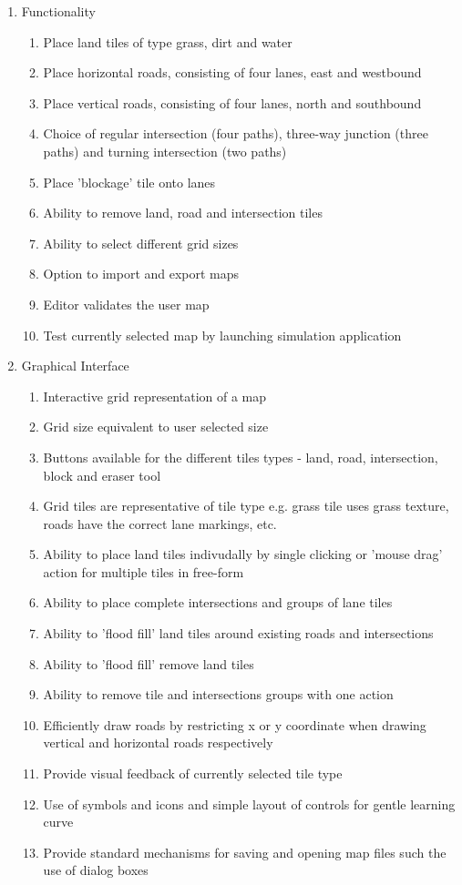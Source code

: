 \begin{enumerate}\itemsep1pt \parskip0pt 
  \item Functionality
  \begin{enumerate}[label*=\arabic*.]
    \item Place land tiles of type grass, dirt and water
    \item Place horizontal roads, consisting of four lanes, east and westbound
    \item Place vertical roads, consisting of four lanes, north and southbound
    \item Choice of regular intersection (four paths), three-way junction (three paths) and turning intersection (two paths) 
    \item Place 'blockage' tile onto lanes
    \item Ability to remove land, road and intersection tiles
    \item Ability to select different grid sizes
    \item Option to import and export maps
	\item Editor validates the user map
	\item Test currently selected map by launching simulation application
  \end{enumerate}
    \item Graphical Interface
  \begin{enumerate}[label*=\arabic*.]
	\item Interactive grid representation of a map
	\item Grid size equivalent to user selected size
	\item Buttons available for the different tiles types - land, road, intersection, block and eraser tool
		\item Grid tiles are representative of tile type e.g. grass tile uses grass texture, roads have the correct lane markings, etc.
	\item Ability to place land tiles indivudally by single clicking or 'mouse drag' action for multiple tiles in free-form
	\item Ability to place complete intersections and groups of lane tiles
	\item Ability to 'flood fill' land tiles around existing roads and intersections
	\item Ability to 'flood fill' remove land tiles
	\item Ability to remove tile and intersections groups with one action
	\item Efficiently draw roads by restricting x or y coordinate when drawing vertical and horizontal roads respectively
	\item Provide visual feedback of currently selected tile type
	\item Use of symbols and icons and simple layout of controls for gentle learning curve
	\item Provide standard mechanisms for saving and opening map files such the use of dialog boxes
  \end{enumerate}
\end{enumerate}

